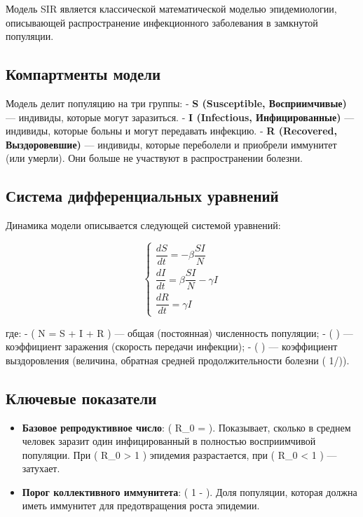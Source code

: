 \documentclass[
  12pt,
  a4paper,
  DIV=11,
  numbers=noendperiod]{scrreprt}
\providecommand{\tightlist}{%
  \setlength{\itemsep}{0pt}\setlength{\parskip}{0pt}}\usepackage{longtable,booktabs,array}
\begin{document}
Модель SIR является классической математической моделью эпидемиологии,
описывающей распространение инфекционного заболевания в замкнутой
популяции.

\subsection{Компартменты
модели}\label{ux43aux43eux43cux43fux430ux440ux442ux43cux435ux43dux442ux44b-ux43cux43eux434ux435ux43bux438}

Модель делит популяцию на три группы: - \textbf{S (Susceptible,
Восприимчивые)} --- индивиды, которые могут заразиться. - \textbf{I
(Infectious, Инфицированные)} --- индивиды, которые больны и могут
передавать инфекцию. - \textbf{R (Recovered, Выздоровевшие)} ---
индивиды, которые переболели и приобрели иммунитет (или умерли). Они
больше не участвуют в распространении болезни.

\subsection{Система дифференциальных
уравнений}\label{ux441ux438ux441ux442ux435ux43cux430-ux434ux438ux444ux444ux435ux440ux435ux43dux446ux438ux430ux43bux44cux43dux44bux445-ux443ux440ux430ux432ux43dux435ux43dux438ux439}

Динамика модели описывается следующей системой уравнений:

\[
\begin{cases}
\dfrac{dS}{dt} = -\beta \dfrac{S I}{N} \\[1em]
\dfrac{dI}{dt} = \beta \dfrac{S I}{N} - \gamma I \\[1em]
\dfrac{dR}{dt} = \gamma I
\end{cases}
\]

где: - ( N = S + I + R ) --- общая (постоянная) численность популяции; -
( \beta ) --- коэффициент заражения (скорость передачи инфекции); - (
\gamma ) --- коэффициент выздоровления (величина, обратная средней
продолжительности болезни ( 1/\gamma )).

\subsection{Ключевые
показатели}\label{ux43aux43bux44eux447ux435ux432ux44bux435-ux43fux43eux43aux430ux437ux430ux442ux435ux43bux438}

\begin{itemize}
\tightlist
\item
  \textbf{Базовое репродуктивное число}: ( R\_0 = \dfrac{\beta}{\gamma}
  ). Показывает, сколько в среднем человек заразит один инфицированный в
  полностью восприимчивой популяции. При ( R\_0 \textgreater{} 1 )
  эпидемия разрастается, при ( R\_0 \textless{} 1 ) --- затухает.
\item
  \textbf{Порог коллективного иммунитета}: ( 1 -  ). Доля
  популяции, которая должна иметь иммунитет для предотвращения роста
  эпидемии.
\end{itemize}
\end{document}
